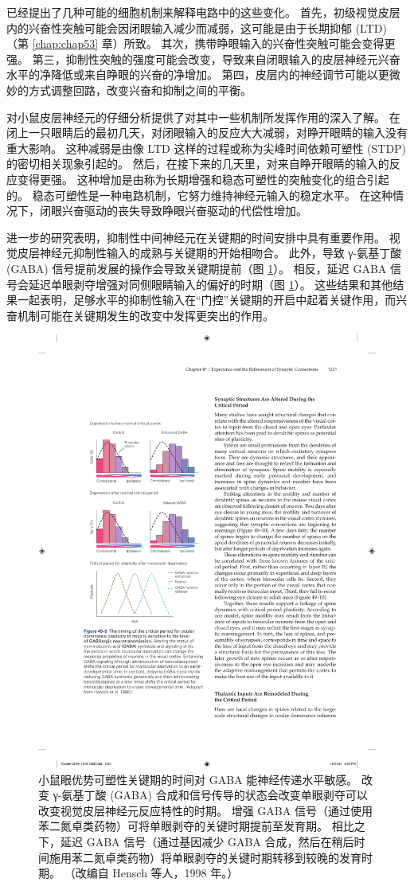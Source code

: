 已经提出了几种可能的细胞机制来解释电路中的这些变化。
首先，初级视觉皮层内的兴奋性突触可能会因闭眼输入减少而减弱，这可能是由于长期抑郁 (LTD)（第 \ref{chap:chap53} 章）所致。
其次，携带睁眼输入的兴奋性突触可能会变得更强。
第三，抑制性突触的强度可能会改变，导致来自闭眼输入的皮层神经元兴奋水平的净降低或来自睁眼的兴奋的净增加。
第四，皮层内的神经调节可能以更微妙的方式调整回路，改变兴奋和抑制之间的平衡。


对小鼠皮层神经元的仔细分析提供了对其中一些机制所发挥作用的深入了解。
在闭上一只眼睛后的最初几天，对闭眼输入的反应大大减弱，对睁开眼睛的输入没有重大影响。
这种减弱是由像 LTD 这样的过程或称为尖峰时间依赖可塑性 (STDP) 的密切相关现象引起的。
然后，在接下来的几天里，对来自睁开眼睛的输入的反应变得更强。
这种增加是由称为长期增强和稳态可塑性的突触变化的组合引起的。
稳态可塑性是一种电路机制，它努力维持神经元输入的稳定水平。
在这种情况下，闭眼兴奋驱动的丧失导致睁眼兴奋驱动的代偿性增加。


进一步的研究表明，抑制性中间神经元在关键期的时间安排中具有重要作用。
视觉皮层神经元抑制性输入的成熟与关键期的开始相吻合。
此外，导致 γ-氨基丁酸 (GABA) 信号提前发展的操作会导致关键期提前（图 \ref{fig:49_9}）。
相反，延迟 GABA 信号会延迟单眼剥夺增强对同侧眼睛输入的偏好的时期（图 \ref{fig:49_9}）。
这些结果和其他结果一起表明，足够水平的抑制性输入在“门控”关键期的开启中起着关键作用，而兴奋机制可能在关键期发生的改变中发挥更突出的作用。


\begin{figure}[htbp]
	\centering
	\includegraphics[width=0.5\linewidth]{chap49/fig_49_9}
	\caption{小鼠眼优势可塑性关键期的时间对 GABA 能神经传递水平敏感。 改变 γ-氨基丁酸 (GABA) 合成和信号传导的状态会改变单眼剥夺可以改变视觉皮层神经元反应特性的时期。 增强 GABA 信号（通过使用苯二氮卓类药物）可将单眼剥夺的关键时期提前至发育期。 相比之下，延迟 GABA 信号（通过基因减少 GABA 合成，然后在稍后时间施用苯二氮卓类药物）将单眼剥夺的关键时期转移到较晚的发育时期。 （改编自 Hensch 等人，1998 年。）}
	\label{fig:49_9}
\end{figure}


